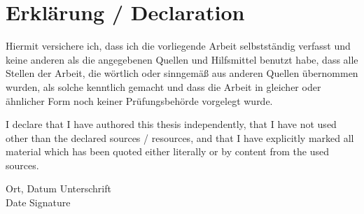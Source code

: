 \clearpage

\pagestyle{useheadings} %

\chapter*{Erklärung / Declaration}

Hiermit versichere ich, dass ich die vorliegende Arbeit selbstständig verfasst und keine anderen als die angegebenen Quellen und Hilfsmittel benutzt habe, dass alle Stellen der Arbeit, die wörtlich oder sinngemäß aus anderen Quellen übernommen wurden, als solche kenntlich gemacht und dass die Arbeit in gleicher oder ähnlicher Form noch keiner Prüfungsbehörde vorgelegt wurde.

\vspace{15mm}

I declare that I have authored this thesis independently, that I have not used other than the declared
sources / resources, and that I have explicitly marked all material which has been quoted either
literally or by content from the used sources.

\vspace{5cm}
Ort, Datum \hspace{10cm} Unterschrift\\
Date \hspace{11.5cm} Signature\\



\tableofcontents







